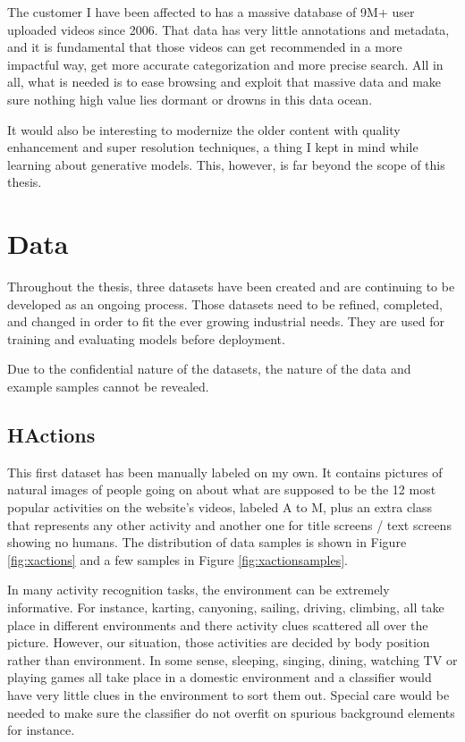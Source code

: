 The customer I have been affected to has a massive database of 9M+ user uploaded videos since 2006. That data has very little annotations and metadata, and it is fundamental that those videos can get recommended in a more impactful way, get more accurate categorization and more precise search. All in all, what is needed is to ease browsing and exploit that massive data and make sure nothing high value lies dormant or drowns in this data ocean.

It would also be interesting to modernize the older content with quality enhancement and super resolution techniques, a thing I kept in mind while learning about generative models. This, however, is far beyond the scope of this thesis.

\section{Data}
\label{sec:hexadata}

Throughout the thesis, three datasets have been created and are continuing to be developed as an ongoing process. Those datasets need to be refined, completed, and changed in order to fit the ever growing industrial needs. They are used for training and evaluating models before deployment.

Due to the confidential nature of the datasets, the nature of the data and example samples cannot be revealed.

\subsection{HActions}
\label{sec:hactions}

This first dataset has been manually labeled on my own. It contains pictures of natural images of people going on about what are supposed to be the 12 most popular activities on the website's videos, labeled A to M, plus an extra class that represents any other activity and another one for title screens / text screens showing no humans. The distribution of data samples is shown in Figure \ref{fig:xactions} and a few samples in Figure \ref{fig:xactionsamples}.

In many activity recognition tasks, the environment can be extremely informative. For instance, karting, canyoning, sailing, driving, climbing, all take place in different environments and there activity clues scattered all over the picture. However, our situation, those activities are decided by body position rather than environment. In some sense, sleeping, singing, dining, watching TV or playing games all take place in a domestic environment and a classifier would have very little clues in the environment to sort them out. Special care would be needed to make sure the classifier do not overfit on spurious background elements for instance.

